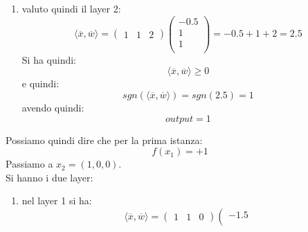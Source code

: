 \begin{esercizio}
\begin{enumerate}
\[									      	\begin{matrix}
									      		-1.5 \\
									      		1    \\
									      		1    \\
									      	\end{matrix}
									      	\right)= -1.5+0+2 = 0.5\]
									      	Si ha quindi:
									      	\[\langle \overline{x},\overline{w}\rangle\geq 0\]
									      	e quindi:
									      	\[sgn(\langle \overline{x},\overline{w}\rangle)=sgn(0.5)=1\]
									      	avendo quindi:
									      	\[y_h=1\]
									      	che sarà tra gli input del secondo layer
									      	\item valuto quindi il layer 2:
									      	\[\langle \overline{x},\overline{w}\rangle=
									      		\left(\begin{matrix}
									      		1 & 1 & 2
									      		\end{matrix}\right)
									      		\left(
									      		\begin{matrix}
									      			-0.5 \\
									      			1    \\
									      			1    \\
									      		\end{matrix}
									      		\right)= -0.5+1+2 = 2.5\]
									      		Si ha quindi:
									      		\[\langle \overline{x},\overline{w}\rangle\geq 0\]
									      		e quindi:
									      		\[sgn(\langle \overline{x},\overline{w}\rangle)=sgn(2.5)=1\]
									      		avendo quindi:
									      		\[output=1\]
									      		\end{enumerate}
									      		Possiamo quindi dire che per la prima istanza:
									      		\[f(x_1)=+1\]
									      		Passiamo a $x_2=(1, 0, 0)$.\\
									      		Si hanno i due layer:
									      		\begin{enumerate}
									      			\item nel layer 1 si ha:
									      			      \[\langle \overline{x},\overline{w}\rangle=
									      			      	\left(\begin{matrix}
									      			      	1 & 1 & 0
									      			      	\end{matrix}\right)
									      			      	\left(
									      			      	\begin{matrix}
									      			      		-1.5 \\

\end{matrix}\]
\end{enumerate}
\end{esercizio}
